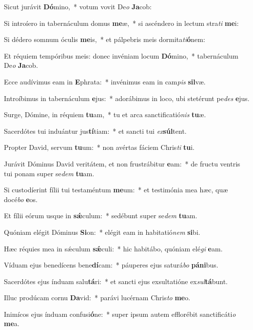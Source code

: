 \item Sicut jurávit \textbf{Dó}mino,~* votum vovit De\textit{o} \textbf{Ja}cob:
\item Si introíero in tabernáculum domus \textbf{me}æ,~* si ascéndero in lectum stra\textit{ti} \textbf{me}i:
\item Si dédero somnum óculis \textbf{me}is,~* et pálpebris meis dormita\textit{ti}\textbf{ó}nem:
\item Et réquiem tempóribus meis: donec invéniam locum \textbf{Dó}mino,~* tabernáculum De\textit{o} \textbf{Ja}cob.
\item Ecce audívimus eam in \textbf{E}phrata:~* invénimus eam in cam\textit{pis} \textbf{sil}væ.
\item Introíbimus in tabernáculum \textbf{e}jus:~* adorábimus in loco, ubi stetérunt pe\textit{des} \textbf{e}jus.
\item Surge, Dómine, in réquiem \textbf{tu}am,~* tu et arca sanctificatió\textit{nis} \textbf{tu}æ.
\item Sacerdótes tui induántur jus\textbf{tí}tiam:~* et sancti tui \textit{ex}\textbf{súl}tent.
\item Propter David, servum \textbf{tu}um:~* non avértas fáciem Chris\textit{ti} \textbf{tu}i.
\item Jurávit Dóminus David veritátem, et non frustrábitur \textbf{e}am:~* de fructu ventris tui ponam super se\textit{dem} \textbf{tu}am.
\item Si custodíerint fílii tui testaméntum \textbf{me}um:~* et testimónia mea hæc, quæ docé\textit{bo} \textbf{e}os.
\item Et fílii eórum usque in \textbf{sǽ}culum:~* sedébunt super se\textit{dem} \textbf{tu}am.
\item Quóniam elégit Dóminus \textbf{Si}on:~* elégit eam in habitatió\textit{nem} \textbf{si}bi.
\item Hæc réquies mea in sǽculum \textbf{sǽ}culi:~* hic habitábo, quóniam elé\textit{gi} \textbf{e}am.
\item Víduam ejus benedícens bene\textbf{dí}cam:~* páuperes ejus saturá\textit{bo} \textbf{pá}\textbf{ni}bus.
\item Sacerdótes ejus índuam salu\textbf{tá}ri:~* et sancti ejus exsultatióne ex\textit{sul}\textbf{tá}bunt.
\item Illuc prodúcam cornu \textbf{Da}vid:~* parávi lucérnam Chris\textit{to} \textbf{me}o.
\item Inimícos ejus índuam confusi\textbf{ó}ne:~* super ipsum autem efflorébit sanctificáti\textit{o} \textbf{me}a.
